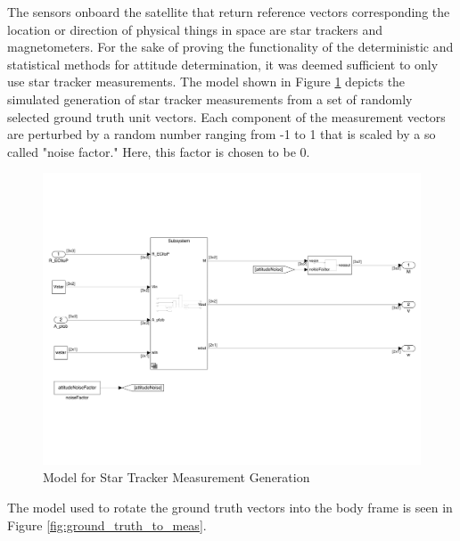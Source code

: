 The sensors onboard the satellite that return reference vectors corresponding the location or direction of physical things in space are star trackers and magnetometers. For the sake of proving the functionality of the deterministic and statistical methods for attitude determination, it was deemed sufficient to only use star tracker measurements. The model shown in Figure \ref{fig:star_tracker_meas} depicts the simulated generation of star tracker measurements from a set of randomly selected ground truth unit vectors. Each component of the measurement vectors are perturbed by a random number ranging from -1 to 1 that is scaled by a so called "noise factor." Here, this factor is chosen to be 0.

\begin{figure}[H]
    \centering
    \captionsetup{ justification = centering }
    \includegraphics[trim={0.25cm 3cm 0.25cm 3cm},clip,width = 15cm]{Images/PS6/raw_meas_star.png}
    \caption{Model for Star Tracker Measurement Generation}
    \label{fig:star_tracker_meas}
\end{figure}

The model used to rotate the ground truth vectors into the body frame is seen in Figure \ref{fig:ground_truth_to_meas}.

